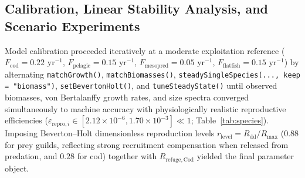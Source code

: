 \documentclass[11pt,letterpaper]{article}
\begin{document}
\begin{table}[t!]
\centering
\caption{Commercial fishing fleets, target species, logistic length-selectivity parameters ($L_{50}, L_{25}$), catchabilities, and baseline pre-collapse/moratorium fishing efforts.}
\label{tab:gears}
\vspace{0.4em}
\end{table}

\subsection{Calibration, Linear Stability Analysis, and Scenario Experiments}

Model calibration proceeded iteratively at a moderate exploitation reference ($F_{\mathrm{cod}} = 0.22\text{ yr}^{-1}$, $F_{\mathrm{pelagic}} = 0.15\text{ yr}^{-1}$, $F_{\mathrm{mesopred}} = 0.05\text{ yr}^{-1}$, $F_{\mathrm{flatfish}} = 0.15\text{ yr}^{-1}$) by alternating \texttt{matchGrowth()}, \texttt{matchBiomasses()}, \texttt{steadySingleSpecies(..., keep = "biomass")}, \texttt{setBevertonHolt()}, and \texttt{tuneSteadyState()} until observed biomasses, von Bertalanffy growth rates, and size spectra converged simultaneously to machine accuracy with physiologically realistic reproductive efficiencies ($\varepsilon_{\mathrm{repro},i} \in [2.12 \times 10^{-6}, 1.70 \times 10^{-3}] \ll 1$; Table~\ref{tab:species}). Imposing Beverton--Holt dimensionless reproduction levels $r_{\mathrm{level}} = R_{\mathrm{dd}} / R_{\max}$ ($0.88$ for prey guilds, reflecting strong recruitment compensation when released from predation, and $0.28$ for cod) together with $R_{\mathrm{refuge,Cod}}$ yielded the final parameter object.
\end{document}
